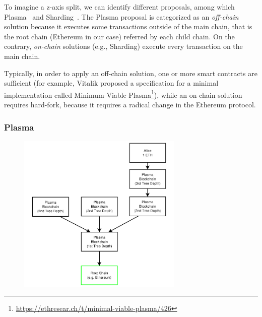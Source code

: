 To imagine a z-axis split, we can identify different proposals, among which
Plasma~\cite{poon2017plasma} and Sharding~\cite{bib:mauve, bib:sharding-faq}.
The Plasma proposal is categorized as an \emph{off-chain} solution because it
executes some transactions outside of the main chain, that is the root chain
(Ethereum in our case) referred by each child chain. On the contrary,
\emph{on-chain} solutions (e.g., Sharding) execute every transaction on the main
chain.


Typically, in order to apply an off-chain solution, one or more smart
contracts are sufficient (for example, Vitalik proposed a specification for a
minimal implementation called Minimum Viable
Plasma\footnote{\url{https://ethresear.ch/t/minimal-viable-plasma/426}}), while
an on-chain solution requires hard-fork, because it requires a radical change in
the Ethereum protocol.

\subsubsection{Plasma}

\begin{figure}[t]
    \begin{center}
        \includegraphics[width=0.7\textwidth]{./res/img/plasma}
        \label{fig:plasma}
    \end{center}
\end{figure}

